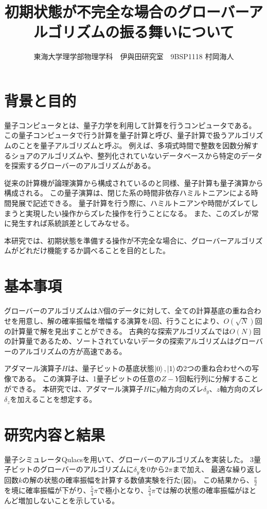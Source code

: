 \documentclass[platex,dvipdfmx, twocolumn]{jsarticle}			%
\title{初期状態が不完全な場合のグローバーアルゴリズムの振る舞いについて}
\author{東海大学理学部物理学科　伊與田研究室　9BSP1118 村岡海人}
\date{}
\begin{document}
\maketitle
\section{背景と目的}
量子コンピュータとは、量子力学を利用して計算を行うコンピュータである。
この量子コンピュータで行う計算を量子計算と呼び、量子計算で扱うアルゴリズムのことを量子アルゴリズムと呼ぶ。
例えば、多項式時間で整数を因数分解するショアのアルゴリズムや、整列化されていないデータベースから特定のデータを探索するグローバーのアルゴリズムがある。

従来の計算機が論理演算から構成されているのと同様、量子計算も量子演算から構成される。
この量子演算は、閉じた系の時間非依存ハミルトニアンによる時間発展で記述できる。
量子計算を行う際に、ハミルトニアンや時間がズレてしまうと実現したい操作からズレた操作を行うことになる。
また、このズレが常に発生すれば系統誤差としてみなせる。

本研究では、初期状態を準備する操作が不完全な場合に、グローバーアルゴリズムがどれだけ機能するか調べることを目的とした。

\section{基本事項}
グローバーのアルゴリズムは$N個$のデータに対して、全ての計算基底の重ね合わせを用意し、解の確率振幅を増幅する演算を$k$回、行うことにより、$O(\sqrt{N})$回の計算量で解を見出すことができる。
古典的な探索アルゴリズムでは$O(N)$回の計算量であるため、ソートされていないデータの探索アルゴリズムはグローバーのアルゴリズムの方が高速である\cite{QuantumDojo}。

アダマール演算子$H$は、量子ビットの基底状態$\ket{0},\ket{1}$の2つの重ね合わせへの写像である。
この演算子は、1量子ビットの任意の$Z-Y$回転行列に分解することができる。
本研究では、アダマール演算子$H$に$y$軸方向のズレ$\delta_y$、$z$軸方向のズレ$\delta_z$を加えることを想定する\cite{BasicQuantumComputer}。


\section{研究内容と結果}
量子シミュレータQulacsを用いて、グローバーのアルゴリズムを実装した。
3量子ビットのグローバーのアルゴリズムに$\delta_y$を$0$から$2\pi$まで加え、
最適な繰り返し回数$k$の解の状態の確率振幅を計算する数値実験を行た(図)。
この結果から、$\frac{\pi}{2}$を境に確率振幅が下がり、$\frac{5}{4}\pi$で極小となり、$\frac{5}{4}\pi$では解の状態の確率振幅がほとんど増加しないことを示している。
\end{document}
